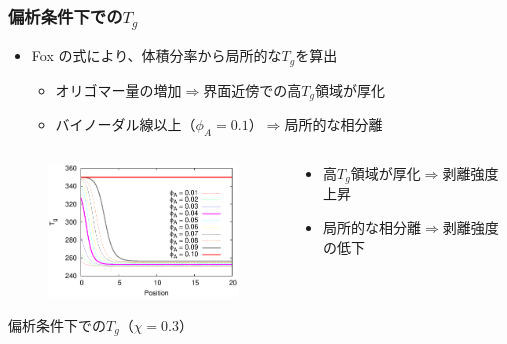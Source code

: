 \documentclass[12pt, dvipdfmx]{beamer}
\begin{document}
\begin{frame}\frametitle{偏析条件下での$T_g$}

\begin{itemize}
	\item Fox の式により、体積分率から局所的な$T_g$を算出
	\begin{itemize}
	\item オリゴマー量の増加$\Rightarrow$界面近傍での高$T_g$領域が厚化
	\item バイノーダル線以上（$\phi_A = 0.1$）$\Rightarrow$局所的な相分離
	\end{itemize}
\end{itemize}

\begin{columns}
	\begin{column}{6.0cm}
		\vspace{-1\baselineskip}
		\begin{figure}[htbp]
			\begin{center}
				\includegraphics[width=60mm]{A6_B600_Chi_03_chiS_0.0_Tg.eps}
			\end{center}
		\end{figure}
		\begin{center}
			\vspace{-0.5\baselineskip}
			{\footnotesize 偏析条件下での$T_g$（$\chi = 0.3$）}
		\end{center}
	\end{column}
	\begin{column}{6.0cm}
		\begin{block}{}
		\vspace{-0.5\baselineskip}
		{\footnotesize 
		\begin{itemize}
		\item 高$T_g$領域が厚化$\Rightarrow$剥離強度上昇
		\item 局所的な相分離$\Rightarrow$剥離強度の低下
			\end{itemize}
		}
		\end{block}
		\vspace{-1\baselineskip}
		\begin{figure}[htbp]

\end{figure}
\end{column}
\end{columns}
\end{frame}
\end{document}

